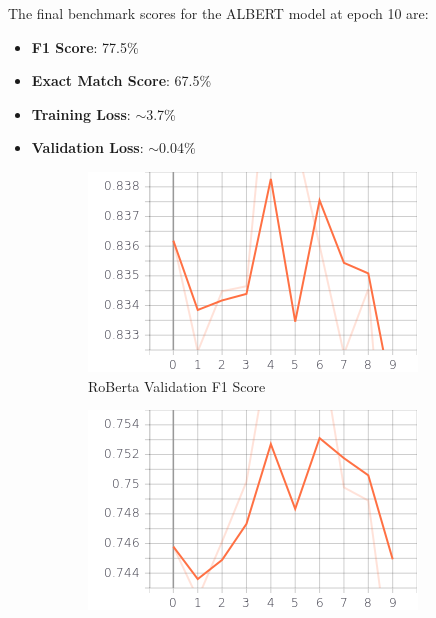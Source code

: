 \documentclass[a4paper,12pt]{report}
\begin{document}
    	The final benchmark scores for the ALBERT model at epoch 10 are:
    	\begin{itemize}
    		\item \textbf{F1 Score}: 77.5\%
    		\item \textbf{Exact Match Score}: 67.5\%
    		\item \textbf{Training Loss}:  $\sim$3.7\%
    		\item \textbf{Validation Loss}: $\sim$0.04\%
    	\end{itemize}


\begin{figure}
	\centering
	\begin{subfigure}[b]{0.4\textwidth}
		\centering
		\includegraphics[width=\textwidth]{../images/Roberta_Val_F1.png}
		\caption{\small RoBerta Validation F1 Score}
		\label{robertaf1}
	\end{subfigure}
	\hfill
	\begin{subfigure}[b]{0.4\textwidth}  
		\centering 
		\includegraphics[width=\textwidth]{../images/Roberta_Val_EM.png}

\end{subfigure}
\end{figure}
\end{document}
